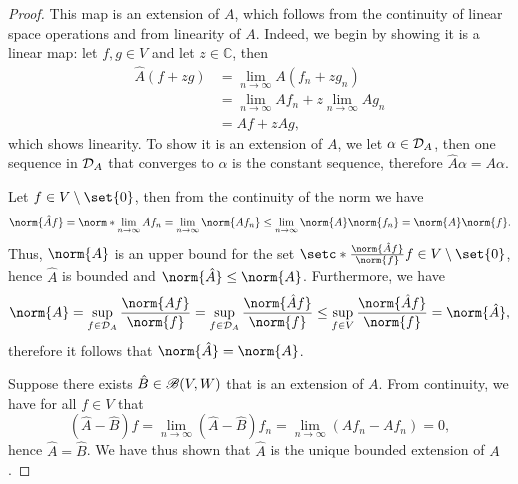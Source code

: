 \begin{proof}
    This map is an extension of \(A\), which follows from the continuity of linear space operations and from linearity of \(A\). Indeed, we begin by showing it is a linear map: let \(f, g \in V\) and let \(z \in \mathbb{C}\), then
    \begin{align*}
        \hat{A}(f + zg) &= \lim_{n\to \infty} A(f_n + zg_n)\\&= \lim_{n\to\infty} Af_n + z \lim_{n\to\infty} Ag_n\\&= Af + z Ag,
    \end{align*}
    which shows linearity. To show it is an extension of \(A\), we let \(\alpha \in \mathcal{D}_{A}\), then one sequence in \(\mathcal{D}_{A}\) that converges to \(\alpha\) is the constant sequence, therefore \(\hat{A}\alpha = A\alpha\).

    Let \(f \in V\setminus\set{0}\), then from the continuity of the norm we have
    \begin{equation*}
        \norm{\hat{A} f} = \norm*{\lim_{n\to\infty} Af_n} = \lim_{n\to \infty} \norm{A f_n} \leq \lim_{n\to \infty} \norm{A} \norm{f_n} = \norm{A} \norm{f}.
    \end{equation*}
    Thus, \(\norm{A}\) is an upper bound for the set \(\setc*{\frac{\norm{\hat{A}f}}{\norm{f}}}{f \in V\setminus\set{0}}\), hence \(\hat{A}\) is bounded and \(\norm{\hat{A}} \leq \norm{A}\). Furthermore, we have
    \begin{equation*}
        \norm{A} = \sup_{f\in\domain{A}}\frac{\norm{Af}}{\norm{f}}= \sup_{f\in\domain{A}}\frac{\norm{\hat{A}f}}{\norm{f}} \leq \sup_{f \in V} \frac{\norm{\hat{A}f}}{\norm{f}} = \norm{\hat{A}},
    \end{equation*}
    therefore it follows that \(\norm{\hat{A}} = \norm{A}\).

    Suppose there exists \(\hat{B} \in \mathscr{B}(V, W)\) that is an extension of \(A\). From continuity, we have for all \(f \in V\) that
    \begin{equation*}
        (\hat{A} - \hat{B})f = \lim_{n\to\infty} (\hat{A} - \hat{B})f_n = \lim_{n\to \infty} (Af_n - Af_n) = 0,
    \end{equation*}
    hence \(\hat{A} = \hat{B}\). We have thus shown that \(\hat{A}\) is the unique bounded extension of \(A\).
\end{proof}
